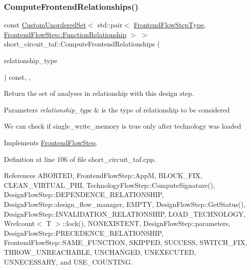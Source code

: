 \subsubsection{\texorpdfstring{Compute\+Frontend\+Relationships()}{ComputeFrontendRelationships()}}
{\footnotesize\ttfamily const \hyperlink{classCustomUnorderedSet}{Custom\+Unordered\+Set}$<$ std\+::pair$<$ \hyperlink{frontend__flow__step_8hpp_afeb3716c693d2b2e4ed3e6d04c3b63bb}{Frontend\+Flow\+Step\+Type}, \hyperlink{classFrontendFlowStep_af7cf30f2023e5b99e637dc2058289ab0}{Frontend\+Flow\+Step\+::\+Function\+Relationship} $>$ $>$ short\+\_\+circuit\+\_\+taf\+::\+Compute\+Frontend\+Relationships (\begin{DoxyParamCaption}\item[{const \hyperlink{classDesignFlowStep_a723a3baf19ff2ceb77bc13e099d0b1b7}{Design\+Flow\+Step\+::\+Relationship\+Type}}]{relationship\+\_\+type }\end{DoxyParamCaption}) const\hspace{0.3cm}{\ttfamily [override]}, {\ttfamily [private]}, {\ttfamily [virtual]}}



Return the set of analyses in relationship with this design step. 


\begin{DoxyParams}{Parameters}
{\em relationship\+\_\+type} & is the type of relationship to be considered \\
\hline
\end{DoxyParams}
We can check if single\+\_\+write\+\_\+memory is true only after technology was loaded 

Implements \hyperlink{classFrontendFlowStep_abeaff70b59734e462d347ed343dd700d}{Frontend\+Flow\+Step}.



Definition at line 106 of file short\+\_\+circuit\+\_\+taf.\+cpp.



References A\+B\+O\+R\+T\+ED, Frontend\+Flow\+Step\+::\+AppM, B\+L\+O\+C\+K\+\_\+\+F\+IX, C\+L\+E\+A\+N\+\_\+\+V\+I\+R\+T\+U\+A\+L\+\_\+\+P\+HI, Technology\+Flow\+Step\+::\+Compute\+Signature(), Design\+Flow\+Step\+::\+D\+E\+P\+E\+N\+D\+E\+N\+C\+E\+\_\+\+R\+E\+L\+A\+T\+I\+O\+N\+S\+H\+IP, Design\+Flow\+Step\+::design\+\_\+flow\+\_\+manager, E\+M\+P\+TY, Design\+Flow\+Step\+::\+Get\+Status(), Design\+Flow\+Step\+::\+I\+N\+V\+A\+L\+I\+D\+A\+T\+I\+O\+N\+\_\+\+R\+E\+L\+A\+T\+I\+O\+N\+S\+H\+IP, L\+O\+A\+D\+\_\+\+T\+E\+C\+H\+N\+O\+L\+O\+GY, Wrefcount$<$ T $>$\+::lock(), N\+O\+N\+E\+X\+I\+S\+T\+E\+NT, Design\+Flow\+Step\+::parameters, Design\+Flow\+Step\+::\+P\+R\+E\+C\+E\+D\+E\+N\+C\+E\+\_\+\+R\+E\+L\+A\+T\+I\+O\+N\+S\+H\+IP, Frontend\+Flow\+Step\+::\+S\+A\+M\+E\+\_\+\+F\+U\+N\+C\+T\+I\+ON, S\+K\+I\+P\+P\+ED, S\+U\+C\+C\+E\+SS, S\+W\+I\+T\+C\+H\+\_\+\+F\+IX, T\+H\+R\+O\+W\+\_\+\+U\+N\+R\+E\+A\+C\+H\+A\+B\+LE, U\+N\+C\+H\+A\+N\+G\+ED, U\+N\+E\+X\+E\+C\+U\+T\+ED, U\+N\+N\+E\+C\+E\+S\+S\+A\+RY, and U\+S\+E\+\_\+\+C\+O\+U\+N\+T\+I\+NG.

